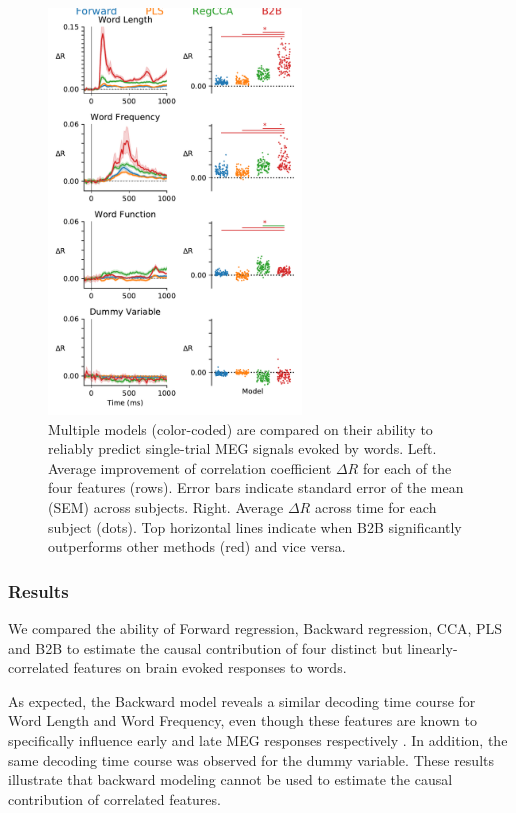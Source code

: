 \begin{figure}
  \begin{center}
    \includegraphics[width=0.6\textwidth,
                     trim=0cm 0cm 0cm 0cm, clip=True]{figures/meg.pdf}
  \end{center}
  \caption{Multiple models (color-coded) are compared on their ability to
  reliably predict single-trial MEG signals evoked by words. Left. Average
  improvement of correlation coefficient $\Delta R$ for each of the four
  features (rows). Error bars indicate standard error of the mean (SEM) across
  subjects. Right. Average $\Delta R$ across time for each subject (dots). Top
  horizontal lines indicate when B2B significantly outperforms other methods
  (red) and vice versa. \label{fig:meg_results}
}
\end{figure}


\subsubsection{Results}
We compared the ability of Forward regression, Backward regression, CCA, PLS and
B2B to estimate the causal contribution of four distinct but linearly-correlated features
on brain evoked responses to words.

As expected, the Backward model reveals a similar decoding time course for Word
Length and Word Frequency, even though these features are known to specifically
influence early and late MEG responses respectively \citep{kutas2011thirty}. In
addition, the same decoding time course was observed for the dummy variable.
These results illustrate that backward modeling cannot be used to estimate the
causal contribution of correlated features.

